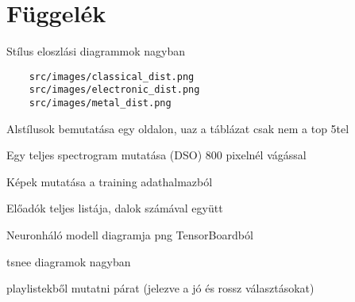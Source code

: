 \pagebreak
\pagestyle{semifancy}
\section{Függelék}

Stílus eloszlási diagrammok nagyban
\begin{verbatim}
    src/images/classical_dist.png
    src/images/electronic_dist.png
    src/images/metal_dist.png
\end{verbatim}

\pagebreak

Alstílusok bemutatása egy oldalon, uaz a táblázat csak nem a top 5tel

\pagebreak
Egy teljes spectrogram mutatása (DSO) 800 pixelnél vágással

\pagebreak
Képek mutatása a training adathalmazból

\pagebreak
Előadók teljes listája, dalok számával együtt

\pagebreak
Neuronháló modell diagramja png TensorBoardból

\pagebreak
tsnee diagramok nagyban

\pagebreak
playlistekből mutatni párat (jelezve a jó és rossz választásokat)
